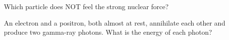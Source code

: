 \begin{quizq}{}
Which particle does NOT feel the strong nuclear force?
\end{quizq}

\begin{quizq}{}
An electron and a positron, both almost at rest, annihilate each other and produce two gamma-ray
photons. What is the energy of each photon?
\end{quizq}
